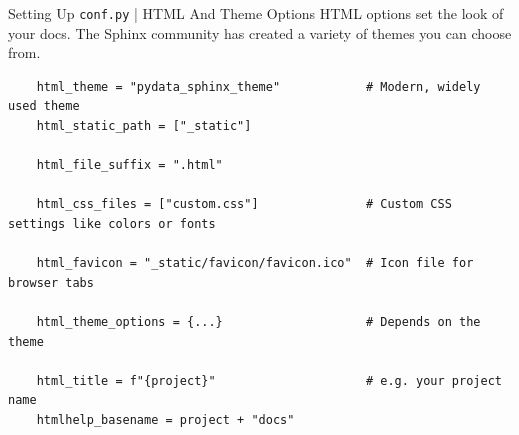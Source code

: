 \begin{frame}[fragile]{Setting Up \texttt{conf.py} | HTML And Theme Options}
  HTML options set the look of your docs. The Sphinx community has created a variety of
  themes you can choose from.
  {
  \footnotesize
  \begin{verbatim}
    html_theme = "pydata_sphinx_theme"            # Modern, widely used theme
    html_static_path = ["_static"]

    html_file_suffix = ".html"

    html_css_files = ["custom.css"]               # Custom CSS settings like colors or fonts

    html_favicon = "_static/favicon/favicon.ico"  # Icon file for browser tabs

    html_theme_options = {...}                    # Depends on the theme

    html_title = f"{project}"                     # e.g. your project name
    htmlhelp_basename = project + "docs"
  \end{verbatim}
  }
\end{frame}




